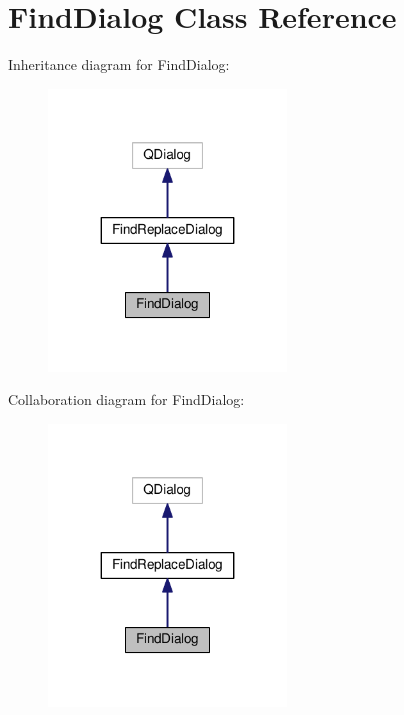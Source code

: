 \hypertarget{classFindDialog}{}\section{Find\+Dialog Class Reference}
\label{classFindDialog}


Inheritance diagram for Find\+Dialog\+:\nopagebreak
\begin{figure}[H]
\begin{center}
\leavevmode
\includegraphics[width=179pt]{classFindDialog__inherit__graph}
\end{center}
\end{figure}


Collaboration diagram for Find\+Dialog\+:\nopagebreak
\begin{figure}[H]
\begin{center}
\leavevmode
\includegraphics[width=179pt]{classFindDialog__coll__graph}
\end{center}
\end{figure}

